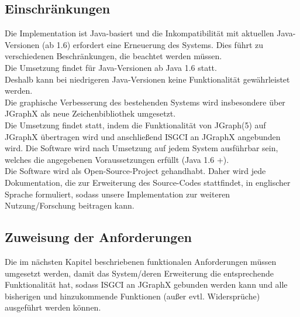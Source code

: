 \documentclass[11pt,a4paper]{article}
\begin{document}
	\subsection{Einschränkungen} %
	Die Implementation ist Java-basiert und die Inkompatibilität mit aktuellen Java-Versionen (ab 1.6) erfordert eine Erneuerung des Systems. Dies führt zu verschiedenen Beschränkungen, die beachtet werden müssen.\\
	Die Umsetzung findet für Java-Versionen ab Java 1.6 statt. \\
	Deshalb kann bei niedrigeren Java-Versionen keine Funktionalität gewährleistet werden.\\
	Die graphische Verbesserung des bestehenden Systems wird insbesondere über JGraphX als neue Zeichenbibliothek umgesetzt.\\
	Die Umsetzung findet statt, indem die Funktionalität von JGraph(5) auf JGraphX übertragen wird und anschließend ISGCI an JGraphX angebunden wird.  %
	Die Software wird nach Umsetzung auf jedem System ausführbar sein, welches die angegebenen Voraussetzungen erfüllt (Java 1.6 +).\\
	Die Software wird als Open-Source-Project %
gehandhabt. Daher wird jede Dokumentation, die zur Erweiterung des Source-Codes stattfindet, in englischer Sprache formuliert, sodass unsere Implementation zur weiteren Nutzung/Forschung beitragen kann. 
	\subsection{Zuweisung der Anforderungen} %
	Die im nächsten Kapitel beschriebenen funktionalen Anforderungen müssen umgesetzt werden, damit das System/deren Erweiterung die entsprechende Funktionalität hat, sodass ISGCI an JGraphX gebunden werden kann und alle bisherigen und hinzukommende Funktionen (außer evtl. Widersprüche) ausgeführt werden können.
\newpage
\end{document}
